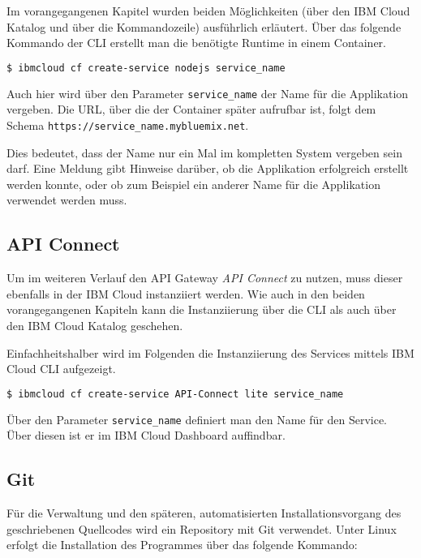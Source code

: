 Im vorangegangenen Kapitel wurden beiden Möglichkeiten (über den IBM Cloud Katalog und über die Kommandozeile)
ausführlich erläutert. Über das folgende Kommando der CLI erstellt man die benötigte Runtime in einem Container.

\begin{lstlisting}[language=bash, caption=Instanziierung der Node.js Runtime, label=ls:vorbereitung_nodejstensorflow]
    $ ibmcloud cf create-service nodejs service_name
\end{lstlisting}

Auch hier wird über den Parameter \texttt{service\_name} der Name für die Applikation vergeben. Die URL, über die
der Container später aufrufbar ist, folgt dem Schema \texttt{https://service\_name.mybluemix.net}.

Dies bedeutet, dass der Name nur ein Mal im kompletten System vergeben sein darf. Eine Meldung gibt Hinweise darüber, ob
die Applikation erfolgreich erstellt werden konnte, oder ob zum Beispiel ein anderer Name für die Applikation verwendet
werden muss.

\subsection{API Connect}
\label{subsec:vorbereitung_apiconnect}
Um im weiteren Verlauf den API Gateway \textit{API Connect} zu nutzen, muss dieser ebenfalls in der IBM Cloud
instanziiert werden. Wie auch in den beiden vorangegangenen Kapiteln kann die Instanziierung über die CLI als auch
über den IBM Cloud Katalog geschehen.

Einfachheitshalber wird im Folgenden die Instanziierung des Services mittels IBM Cloud CLI aufgezeigt.

\begin{lstlisting}[language=bash, caption=Instanziierung von API Connect, label=ls:vorbereitung_apiconnect]
$ ibmcloud cf create-service API-Connect lite service_name
\end{lstlisting}

Über den Parameter \texttt{service\_name} definiert man den Name für den Service. Über diesen ist er im IBM Cloud
Dashboard auffindbar.

\subsection{Git}
Für die Verwaltung und den späteren, automatisierten Installationsvorgang des geschriebenen Quellcodes wird ein
Repository mit Git verwendet. Unter Linux erfolgt die Installation des Programmes über das folgende Kommando:


